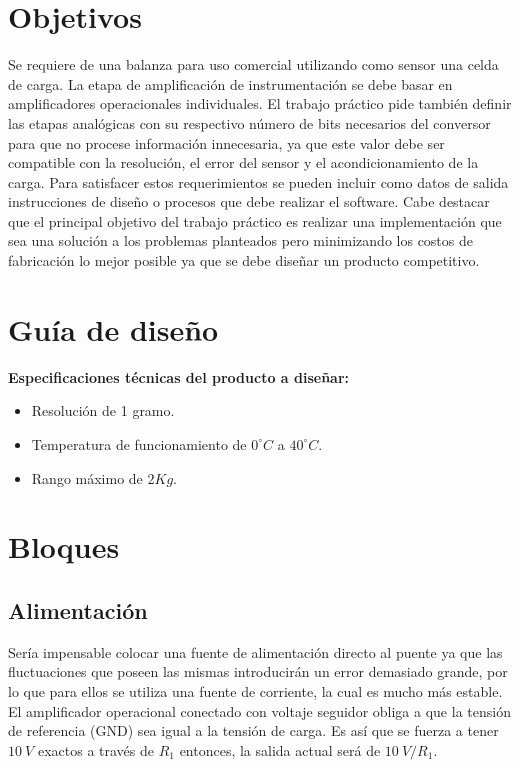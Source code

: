 \documentclass[12pt,A4paper,titlepage]{article}
\begin{document}
\section{Objetivos}

\hspace{1mm}
Se requiere de una balanza para uso comercial utilizando como sensor una celda de carga. La etapa de amplificación de instrumentación se debe basar en amplificadores operacionales individuales. El trabajo práctico pide también definir las etapas analógicas con su respectivo número de bits necesarios del conversor para que no procese información innecesaria, ya que este valor debe ser compatible con la resolución, el error del sensor y el acondicionamiento de la carga. Para satisfacer estos requerimientos se pueden incluir como datos de salida instrucciones de diseño o procesos que debe realizar el software. Cabe destacar que el principal objetivo del trabajo práctico es realizar una implementación que sea una solución a los problemas planteados pero minimizando los costos de fabricación lo mejor posible ya que se debe diseñar un producto competitivo.

\section{Guía de diseño}
\textbf{Especificaciones técnicas del producto a diseñar:}

    \begin{itemize}
        \item Resolución de 1 gramo.
        \item Temperatura de funcionamiento de $0^{\circ}C$ a $40^{\circ}C$.
        \item Rango máximo de $2Kg$. 	
    \end{itemize}


\newpage
\section{Bloques}
    \subsection{Alimentación}
    \hspace{1mm} Sería impensable colocar una fuente de alimentación directo al puente ya que las fluctuaciones que poseen las mismas introducirán un error demasiado grande, por lo que para ellos se utiliza una fuente de corriente, la cual es mucho más estable. 
    El amplificador operacional conectado con voltaje seguidor obliga a que la tensión de referencia (GND) sea igual a la tensión de carga. Es así que se fuerza a tener \(10~V\) exactos a través de \(R_1 \) entonces, la salida actual será de \(10~V/R_1 \). 
\end{document}
